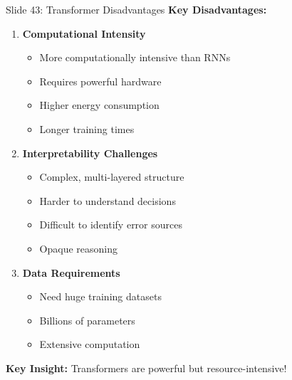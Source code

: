 \documentclass[8pt]{beamer}
\begin{document}
	\begin{frame}{Slide 43: Transformer Disadvantages}
		\fontsize{6.5}{7.5}\selectfont
		\textbf{Key Disadvantages:}
		\begin{enumerate}
			\item \textbf{Computational Intensity}
			\begin{itemize}
				\item More computationally intensive than RNNs
				\item Requires powerful hardware
				\item Higher energy consumption
				\item Longer training times
			\end{itemize}
			\item \textbf{Interpretability Challenges}
			\begin{itemize}
				\item Complex, multi-layered structure
				\item Harder to understand decisions
				\item Difficult to identify error sources
				\item Opaque reasoning
			\end{itemize}
			\item \textbf{Data Requirements}
			\begin{itemize}
				\item Need huge training datasets
				\item Billions of parameters
				\item Extensive computation
			\end{itemize}
		\end{enumerate}
		
		\textcolor{myblue}{\textbf{Key Insight:}} Transformers are powerful but resource-intensive!
	\end{frame}
	
\end{document}

